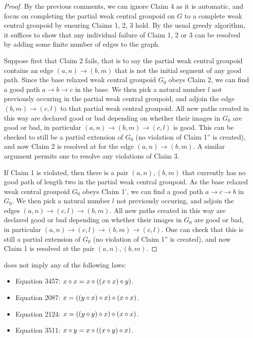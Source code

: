 \begin{proof}  By the previous comments, we can ignore Claim 4 as it is automatic, and focus on completing the partial weak central groupoid on $G$ to a complete weak central groupoid by ensuring Claims 1, 2, 3 hold.  By the usual greedy algorithm, it suffices to show that any individual failure of Claim 1, 2 or 3 can be resolved by adding some finite number of edges to the graph.

  Suppose first that Claim 2 fails, that is to say the partial weak central groupoid contains an edge $(a,n) \to (b,m)$ that is not the initial segment of any good path.  Since the base relaxed weak central groupoid $G_0$ obeys Claim 2, we can find a good path $a \to b \to c$ in the base.  We then pick a natural number $l$ not previously occuring in the partial weak central groupoid, and adjoin the edge $(b,m) \to (c,l)$ to that partial weak central groupoid.  All new paths created in this way are declared good or bad depending on whether their images in $G_0$ are good or bad, in particular $(a,n) \to (b,m) \to (c,l)$ is good.  This can be checked to still be a partial extension of $G_0$ (no violation of Claim 1'' is created), and now Claim 2 is resolved at for the edge $(a,n) \to (b,m)$.  A similar argument permits one to resolve any violations of Claim 3.

If Claim 1 is violated, then there is a pair $(a,n), (b,m)$ that currently has no good path of length two in the partial weak central groupoid.  As the base relaxed weak central groupoid $G_0$ obeys Claim 1', we can find a good path $a \to c \to b$ in $G_0$.  We then pick a natural number $l$ not previously occuring, and adjoin the edges $(a,n) \to (c,l) \to (b,m)$. All new paths created in this way are declared good or bad depending on whether their images in $G_0$ are good or bad, in particular $(a,n) \to (c,l) \to (b,m) \to (c,l)$.  One can check that this is still a partial extension of $G_0$ (no violation of Claim 1'' is created), and now Claim 1 is resolved at the pair $(a,n), (b,m)$.
\end{proof}

\begin{theorem}\label{1485-refutes}\leanok{}
 does not imply any of the following laws:
\begin{itemize}
\item Equation 3457: $x \diamond x = x \diamond ((x \diamond x) \diamond y)$.
\item Equation 2087: $x = ((y \diamond x) \diamond x) \diamond (x \diamond x)$.
\item Equation 2124: $x = ((y \diamond y) \diamond x) \diamond (x \diamond x)$.
\item Equation 3511: $x \diamond y = x \diamond ((x \diamond y) \diamond x)$.
\end{itemize}
\end{theorem}

